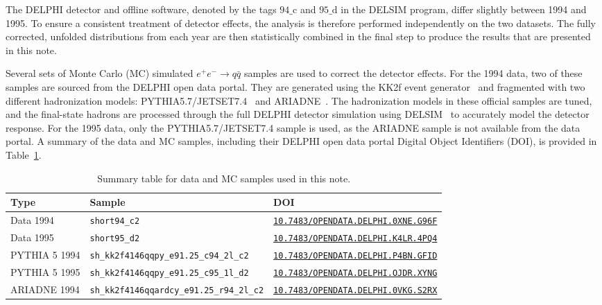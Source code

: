 \documentclass[a4paper,11pt]{article}
\begin{document}
The DELPHI detector and offline software, denoted by the tags $94\_\text{c}$ and $95\_\text{d}$ in the DELSIM program, differ slightly between 1994 and 1995.
To ensure a consistent treatment of detector effects, the analysis is therefore performed independently on the two datasets. The fully corrected, unfolded distributions from each year are then statistically combined in the final step to produce the results that are presented in this note.

Several sets of Monte Carlo (MC) simulated $e^{+}e^{-} \to q\bar{q}$ samples are used to correct the detector effects. For the 1994 data, two of these samples are sourced from the DELPHI open data portal. They are generated using the KK2f event generator~\cite{Jadach:1999vf,Jadach:2000ir} and fragmented with two different hadronization models: PYTHIA5.7/JETSET7.4~\cite{Sjostrand:1995vx} and ARIADNE~\cite{Lonnblad:1992tz}. The hadronization models in these official samples are tuned, and the final-state hadrons are processed through the full DELPHI detector simulation using DELSIM~\cite{DELSIM} to accurately model the detector response. For the 1995 data, only the PYTHIA5.7/JETSET7.4 sample is used, as the ARIADNE sample is not available from the data portal. A summary of the data and MC samples, including their DELPHI open data portal Digital Object Identifiers (DOI), is provided in Table~\ref{tab:SampleSummary}.

\begin{table}[ht]
\centering
\small
\begin{tabular}{l|l|l}
\hline\hline
\textbf{Type} & \textbf{Sample} & \textbf{DOI} \\
\hline
Data 1994 & \texttt{short94\_c2} & \href{https://doi.org/10.7483/OPENDATA.DELPHI.0XNE.G96F}{\texttt{10.7483/OPENDATA.DELPHI.0XNE.G96F}} \\
Data 1995 & \texttt{short95\_d2} & \href{https://doi.org/10.7483/OPENDATA.DELPHI.K4LR.4PQ4}{\texttt{10.7483/OPENDATA.DELPHI.K4LR.4PQ4}} \\
\hline
PYTHIA 5 1994 & \texttt{sh\_kk2f4146qqpy\_e91.25\_c94\_2l\_c2} & \href{https://doi.org/10.7483/OPENDATA.DELPHI.P4BN.GFID}{\texttt{10.7483/OPENDATA.DELPHI.P4BN.GFID}} \\
PYTHIA 5 1995 & \texttt{sh\_kk2f4146qqpy\_e91.25\_c95\_1l\_d2} & \href{https://doi.org/10.7483/OPENDATA.DELPHI.OJDR.XYNG}{\texttt{10.7483/OPENDATA.DELPHI.OJDR.XYNG}} \\
ARIADNE 1994 & \texttt{sh\_kk2f4146qqardcy\_e91.25\_r94\_2l\_c2} & \href{https://doi.org/10.7483/OPENDATA.DELPHI.0VKG.S2RX}{\texttt{10.7483/OPENDATA.DELPHI.0VKG.S2RX}} \\
\hline\hline
\end{tabular}
\caption{Summary table for data and MC samples used in this note.}
\label{tab:SampleSummary}
\end{table}
\end{document}
